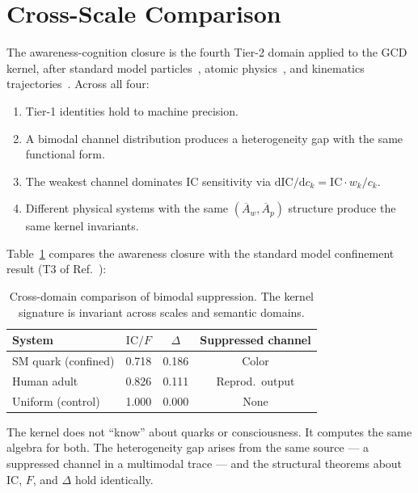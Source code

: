 \documentclass[
  aps,
  prd,
  twocolumn,
  superscriptaddress,
  nofootinbib,
  floatfix
]{revtex4-2}
\newcommand{\dd}{\mathrm{d}}
\newcommand{\IC}{\mathrm{IC}}
\newcommand{\Aw}{\overline{A}_{\!w}}
\newcommand{\Ap}{\overline{A}_{\!p}}
\begin{document}
\section{Cross-Scale Comparison}\label{sec:crossscale}

The awareness-cognition closure is the fourth Tier-2 domain
applied to the GCD kernel, after standard model
particles~\cite{paulus2026sm}, atomic
physics~\cite{paulus2025physicscoherence}, and kinematics
trajectories~\cite{paulus2026kinematics}.  Across all four:

\begin{enumerate}
\item Tier-1 identities hold to machine precision.
\item A bimodal channel distribution produces a heterogeneity
  gap with the same functional form.
\item The weakest channel dominates $\IC$ sensitivity via
  $\dd\IC/\dd c_k = \IC \cdot w_k / c_k$.
\item Different physical systems with the same $(\Aw, \Ap)$
  structure produce the same kernel invariants.
\end{enumerate}

Table~\ref{tab:crossscale} compares the awareness closure
with the standard model confinement result (T3 of
Ref.~\cite{paulus2026sm}):

\begin{table}[h]
\caption{\label{tab:crossscale}Cross-domain comparison of
bimodal suppression.  The kernel signature is invariant
across scales and semantic domains.}
\begin{ruledtabular}
\begin{tabular}{lccc}
System & $\IC/F$ & $\Delta$ & Suppressed channel \\
\hline
SM quark (confined) & 0.718 & 0.186 & Color \\
Human adult & 0.826 & 0.111 & Reprod.\ output \\
Uniform (control) & 1.000 & 0.000 & None \\
\end{tabular}
\end{ruledtabular}
\end{table}

The kernel does not ``know'' about quarks or consciousness.
It computes the same algebra for both.  The heterogeneity
gap arises from the same source --- a suppressed channel
in a multimodal trace --- and the structural theorems
about $\IC$, $F$, and $\Delta$ hold identically.
\end{document}
